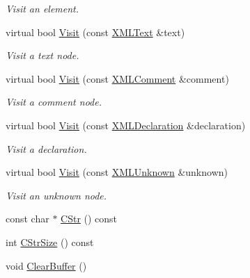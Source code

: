 \begin{DoxyCompactItemize}
\begin{DoxyCompactList}\small\item\em Visit an element. \end{DoxyCompactList}\item 
virtual bool \mbox{\hyperlink{classtinyxml2_1_1_x_m_l_printer_adc0e42b4f6fcb90a95630c79575d030b}{Visit}} (const \mbox{\hyperlink{classtinyxml2_1_1_x_m_l_text}{X\+M\+L\+Text}} \&text)
\begin{DoxyCompactList}\small\item\em Visit a text node. \end{DoxyCompactList}\item 
virtual bool \mbox{\hyperlink{classtinyxml2_1_1_x_m_l_printer_aa294c5c01af0ebb9114902456e4cb53c}{Visit}} (const \mbox{\hyperlink{classtinyxml2_1_1_x_m_l_comment}{X\+M\+L\+Comment}} \&comment)
\begin{DoxyCompactList}\small\item\em Visit a comment node. \end{DoxyCompactList}\item 
virtual bool \mbox{\hyperlink{classtinyxml2_1_1_x_m_l_printer_acfc625b2549304b9c7eb85ebd5c5eb39}{Visit}} (const \mbox{\hyperlink{classtinyxml2_1_1_x_m_l_declaration}{X\+M\+L\+Declaration}} \&declaration)
\begin{DoxyCompactList}\small\item\em Visit a declaration. \end{DoxyCompactList}\item 
virtual bool \mbox{\hyperlink{classtinyxml2_1_1_x_m_l_printer_ab8af5455bbf9e4be2663e6642fcd7e32}{Visit}} (const \mbox{\hyperlink{classtinyxml2_1_1_x_m_l_unknown}{X\+M\+L\+Unknown}} \&unknown)
\begin{DoxyCompactList}\small\item\em Visit an unknown node. \end{DoxyCompactList}\item 
const char $\ast$ \mbox{\hyperlink{classtinyxml2_1_1_x_m_l_printer_a180671d73844f159f2d4aafbc11d106e}{C\+Str}} () const
\item 
int \mbox{\hyperlink{classtinyxml2_1_1_x_m_l_printer_a3256cf3523d4898b91abb18b924be04c}{C\+Str\+Size}} () const
\item 
void \mbox{\hyperlink{classtinyxml2_1_1_x_m_l_printer_a216157765b7267bf389975b1cbf9a909}{Clear\+Buffer}} ()
\end{DoxyCompactItemize}
